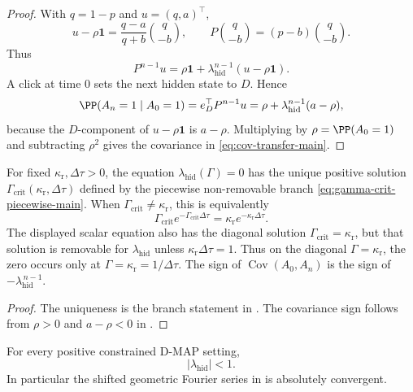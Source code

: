 \begin{proof}
With \(q=1-p\) and \(u=(q,a)^\top\),
\[
u-\rho\mathbf1=\frac{q-a}{q+b}\binom {q}{-b},
\qquad
P\binom {q}{-b}=(p-b)\binom {q}{-b}.
\]
Thus
\[
P^{n-1}u=\rho\mathbf1+
\lambda_{\mathrm{hid}}^{n-1}(u-\rho\mathbf1).
\]
A click at time \(0\) sets the next hidden state to \(D\).  Hence
\[
\PP(A_n=1\mid A_0=1)
=e_D^\top P^{n-1}u
=\rho+\lambda_{\mathrm{hid}}^{n-1}(a-\rho),
\]
because the \(D\)-component of \(u-\rho\mathbf1\) is \(a-\rho\).  Multiplying
by \(\rho=\PP(A_0=1)\) and subtracting \(\rho^2\) gives the covariance in
\eqref{eq:cov-transfer-main}.
\end{proof}

\begin{lemma}\label{lem:critical-rate-main}
For fixed \(\kappa_{\mathrm r},\Delta\tau>0\), the equation
\(\lambda_{\mathrm{hid}}(\Gamma)=0\) has the unique positive solution
\(\Gamma_{\mathrm{crit}}(\kappa_{\mathrm r},\Delta\tau)\) defined by the
piecewise non-removable branch
\eqref{eq:gamma-crit-piecewise-main}.  When
\(\Gamma_{\mathrm{crit}}\ne\kappa_{\mathrm r}\), this is equivalently
\begin{equation}\label{eq:gamma-c-main}
\Gamma_{\mathrm{crit}}e^{-\Gamma_{\mathrm{crit}}\Delta\tau}
=\kappa_{\mathrm r}e^{-\kappa_{\mathrm r}\Delta\tau}.
\end{equation}
The displayed scalar equation also has the diagonal solution
\(\Gamma_{\mathrm{crit}}=\kappa_{\mathrm r}\), but that solution is removable
for \(\lambda_{\mathrm{hid}}\) unless
\(\kappa_{\mathrm r}\Delta\tau=1\).  Thus on the diagonal
\(\Gamma=\kappa_{\mathrm r}\), the zero occurs only at
\(\Gamma=\kappa_{\mathrm r}=1/\Delta\tau\).
The sign of \(\operatorname{Cov}(A_0,A_n)\) is the sign of
\(-\lambda_{\mathrm{hid}}^{\,n-1}\).
\end{lemma}

\begin{proof}
The uniqueness is the branch statement in
.  The covariance sign follows
from \(\rho>0\) and \(a-\rho<0\) in .
\end{proof}

\begin{lemma}\label{lem:hidden-mode-contraction-main}
For every positive constrained D-MAP setting,
\[
|\lambda_{\mathrm{hid}}|<1 .
\]
In particular the shifted geometric Fourier series in
 is absolutely convergent.
\end{lemma}


